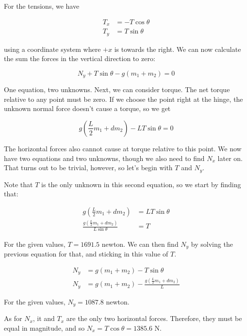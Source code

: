 \documentclass[8.01x]{subfiles}
\begin{document}
For the tensions, we have

\begin{align}
T_x &= -T \cos \theta\\
T_y &= T \sin \theta
\end{align}

using a coordinate system where $+x$ is towards the right. We can now calculate the sum the forces in the vertical direction to zero:

\begin{equation}
N_y + T \sin \theta - g(m_1 + m_2) = 0
\end{equation}

One equation, two unknowns. Next, we can consider torque. The net torque relative to any point must be zero. If we choose the point right at the hinge, the unknown normal force doesn't cause a torque, so we get

\begin{equation}
g\left(\frac{L}{2} m_1 + d m_2\right) - L T \sin \theta = 0
\end{equation}

The horizontal forces also cannot cause at torque relative to this point. We now have two equations and two unknowns, though we also need to find $N_x$ later on. That turns out to be trivial, however, so let's begin with $T$ and $N_y$.

Note that $T$ is the only unknown in this second equation, so we start by finding that:

\begin{align}
g\left(\frac{L}{2} m_1 + d m_2\right) &= L T \sin \theta\\
\frac{g\left(\frac{L}{2} m_1 + d m_2\right)}{L \sin \theta} &= T
\end{align}

For the given values, $T = 1691.5$ newton. We can then find $N_y$ by solving the previous equation for that, and sticking in this value of $T$.

\begin{align}
N_y &= g(m_1 + m_2) - T \sin \theta\\
N_y &= g(m_1 + m_2) - \frac{g\left(\frac{L}{2} m_1 + d m_2\right)}{L}
\end{align}

For the given values, $N_y = 1087.8$ newton.

As for $N_x$, it and $T_x$ are the only two horizontal forces. Therefore, they must be equal in magnitude, and so $N_x = T \cos \theta = 1385.6$ N.
\end{document}
